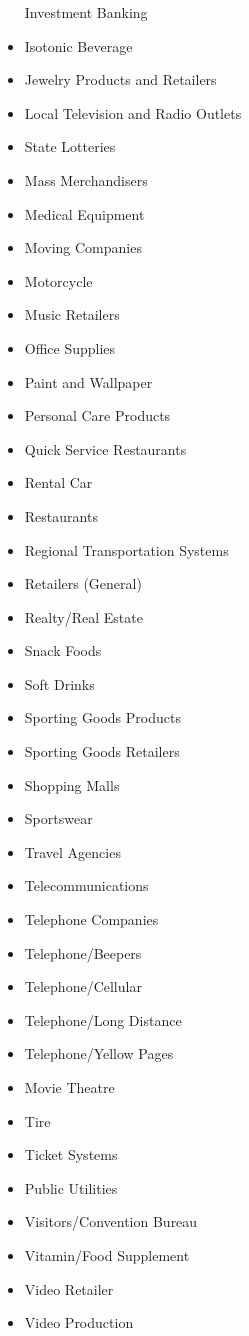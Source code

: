 \documentclass[
]{book}
\begin{document}
\begin{itemize}
  Investment Banking
\item
  Isotonic Beverage
\item
  Jewelry Products and Retailers
\item
  Local Television and Radio Outlets
\item
  State Lotteries
\item
  Mass Merchandisers
\item
  Medical Equipment
\item
  Moving Companies
\item
  Motorcycle
\item
  Music Retailers
\item
  Office Supplies
\item
  Paint and Wallpaper
\item
  Personal Care Products
\item
  Quick Service Restaurants
\item
  Rental Car
\item
  Restaurants
\item
  Regional Transportation Systems
\item
  Retailers (General)
\item
  Realty/Real Estate
\item
  Snack Foods
\item
  Soft Drinks
\item
  Sporting Goods Products
\item
  Sporting Goods Retailers
\item
  Shopping Malls
\item
  Sportswear
\item
  Travel Agencies
\item
  Telecommunications
\item
  Telephone Companies
\item
  Telephone/Beepers
\item
  Telephone/Cellular
\item
  Telephone/Long Distance
\item
  Telephone/Yellow Pages
\item
  Movie Theatre
\item
  Tire
\item
  Ticket Systems
\item
  Public Utilities
\item
  Visitors/Convention Bureau
\item
  Vitamin/Food Supplement
\item
  Video Retailer
\item
  Video Production
\end{itemize}
\end{document}
